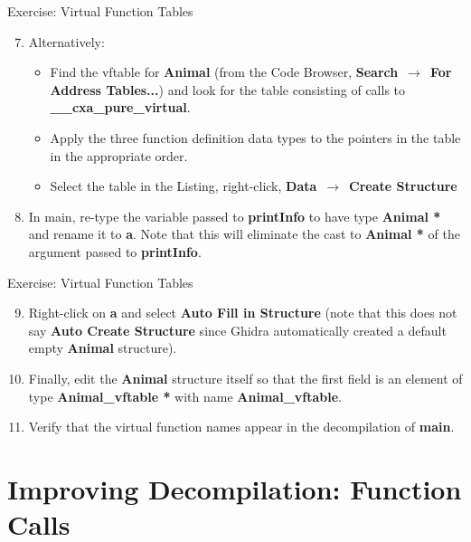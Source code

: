 \documentclass{beamer}
\begin{document}
\begin{frame}
\begin{block}{Exercise: Virtual Function Tables}
\begin{enumerate}
\setcounter{enumi}{6}
\item Alternatively:
\begin{itemize}
\item Find the vftable for \textbf{Animal} (from the Code Browser, \textbf{Search}~$\rightarrow$~\textbf{For Address Tables...}) and look for the table consisting of calls to 
\textbf{\_\_cxa\_pure\_virtual}.
\item Apply the three function definition data types to the pointers in the table in the appropriate order.
\item Select the table in the Listing, right-click, \textbf{Data}~$\rightarrow$~\textbf{Create Structure}
\end{itemize}
\item In main, re-type the variable passed to \textbf{printInfo} to have type \textbf{Animal *} and rename it to \textbf{a}. Note that this will eliminate the
cast to \textbf{Animal *} of the argument passed to \textbf{printInfo}.
\end{enumerate}
\end{block}
\end{frame}

\begin{frame}
\begin{block}{Exercise: Virtual Function Tables}
\begin{enumerate}
\setcounter{enumi}{8}
\item Right-click on \textbf{a} and select \textbf{Auto Fill in Structure} (note that this does not say \textbf{Auto Create Structure} since Ghidra automatically created a default empty \textbf{Animal} structure).
\item Finally, edit the \textbf{Animal} structure itself so that the first field is an element of type \textbf{Animal\_vftable *} with name \textbf{Animal\_vftable}.
\item Verify that the virtual function names appear in the decompilation of \textbf{main}.
\end{enumerate}
\end{block}
\end{frame}

\section{Improving Decompilation: Function Calls}
\end{document}

